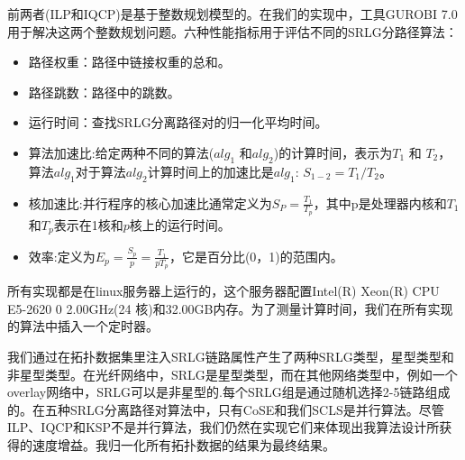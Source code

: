 前两者(ILP和IQCP)是基于整数规划模型的。在我们的实现中，工具GUROBI 7.0\cite{optimization2012gurobi}用于解决这两个整数规划问题。六种性能指标用于评估不同的SRLG分路径算法：
\begin{itemize}
  \item 路径权重：路径中链接权重的总和。
  \item 路径跳数：路径中的跳数。
  \item 运行时间：查找SRLG分离路径对的归一化平均时间。
  \item 算法加速比:给定两种不同的算法($alg_1$ 和$alg_2$)的计算时间，表示为$T_1$ 和 $T_2$，算法$alg_1$对于算法$alg_2$计算时间上的加速比是$alg_1$: ${S_{1 - 2}} = T_1/T_2$。
  \item 核加速比:并行程序的核心加速比\cite{grama2003introduction}通常定义为$S_P=\frac{T_1}{T_p}$，其中p是处理器内核和$T_1$和$T_p$表示在1核和$p$核上的运行时间。
  \item 效率\cite{grama2003introduction}:定义为$E_p=\frac{S_p}{p}=\frac{T_1}{pT_p}$，它是百分比(0，1)的范围内。
  
  
\end{itemize}


所有实现都是在linux服务器上运行的，这个服务器配置Intel(R) Xeon(R) CPU E5-2620 0 \@ 2.00GHz(24 核)和32.00GB内存。为了测量计算时间，我们在所有实现的算法中插入一个定时器。

我们通过在拓扑数据集里注入SRLG链路属性产生了两种SRLG类型，星型类型和非星型类型。在光纤网络中，SRLG是星型类型，而在其他网络类型中，例如一个overlay网络中，SRLG可以是非星型的.每个SRLG组是通过随机选择2-5链路组成的。在五种SRLG分离路径对算法中，只有CoSE和我们SCLS是并行算法。尽管ILP、IQCP和KSP不是并行算法，我们仍然在实现它们来体现出我算法设计所获得的速度增益。我归一化\cite{tax2000feature}所有拓扑数据的结果为最终结果。


